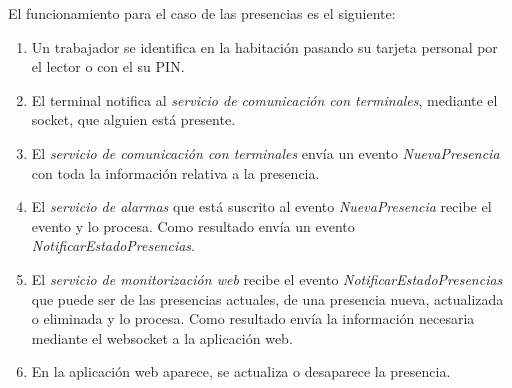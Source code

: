 El funcionamiento para el caso de las presencias es el siguiente:

\begin{enumerate}
	\item Un trabajador se identifica en la habitación pasando su tarjeta personal por el lector o con el su PIN.
	\item El terminal notifica al \textit{servicio de comunicación con terminales}, mediante el socket, que alguien está presente.
	\item El \textit{servicio de comunicación con terminales} envía un evento \textit{NuevaPresencia} con toda la información relativa a la presencia.
	\item El \textit{servicio de alarmas} que está suscrito al evento \textit{NuevaPresencia} recibe el evento y lo procesa. Como resultado envía un evento \textit{NotificarEstadoPresencias}.
	\item El \textit{servicio de monitorización web} recibe el evento \textit{NotificarEstadoPresencias} que puede ser de las presencias actuales, de una presencia nueva, actualizada o eliminada y lo procesa. Como resultado envía la información necesaria mediante el websocket a la aplicación web.
	\item En la aplicación web aparece, se actualiza o desaparece la presencia.
\end{enumerate}




